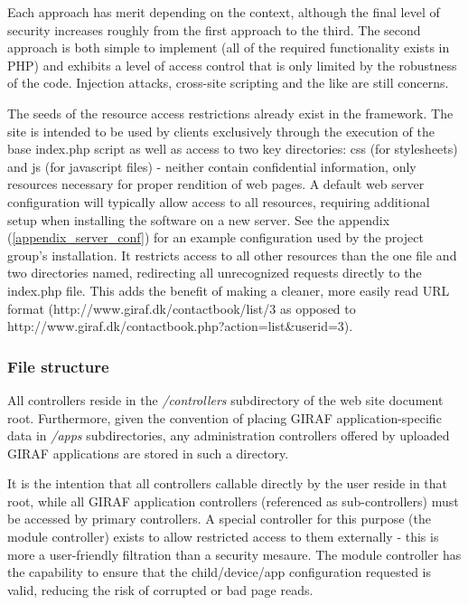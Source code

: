 Each approach has merit depending on the context, although the final level of security increases roughly from the first approach to the third. The second approach is both simple to implement (all of the required functionality exists in PHP) and exhibits a level of access control that is only limited by the robustness of the code. Injection attacks, cross-site scripting and the like are still concerns.

The seeds of the resource access restrictions already exist in the framework. The site is intended to be used by clients exclusively through the execution of the base index.php script as well as access to two key directories: css (for stylesheets) and js (for javascript files) - neither contain confidential information, only resources necessary for proper rendition of web pages. A default web server configuration will typically allow access to all resources, requiring additional setup when installing the software on a new server. See the appendix (\vref{appendix_server_conf}) for an example configuration used by the project group's installation. It restricts access to all other resources than the one file and two directories named, redirecting all unrecognized requests directly to the index.php file. This adds the benefit of making a cleaner, more easily read URL format (http://www.giraf.dk/contactbook/list/3 as opposed to http://www.giraf.dk/contactbook.php?action=list\&userid=3).

\subsubsection*{File structure}
All controllers reside in the \emph{/controllers} subdirectory of the web site document root. Furthermore, given the convention of placing GIRAF application-specific data in \emph{/apps} subdirectories, any administration controllers offered by uploaded GIRAF applications are stored in such a directory.

It is the intention that all controllers callable directly by the user reside in that root, while all GIRAF application controllers (referenced as sub-controllers) must be accessed by primary controllers. A special controller for this purpose (the module controller) exists to allow restricted access to them externally - this is more a user-friendly filtration than a security mesaure. The module controller has the capability to ensure that the child/device/app configuration requested is valid, reducing the risk of corrupted or bad page reads.


